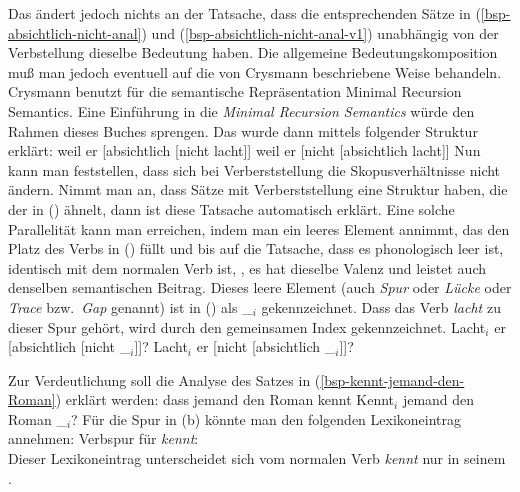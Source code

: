 \begin{enumerate}
{\z
Das ändert jedoch nichts an der Tatsache, dass die entsprechenden
Sätze in (\ref{bsp-absichtlich-nicht-anal}) und (\ref{bsp-absichtlich-nicht-anal-v1}) unabhängig von der Verbstellung
dieselbe Bedeutung haben. Die allgemeine Bedeutungskomposition muß man jedoch eventuell
auf die von Crysmann beschriebene Weise behandeln. Crysmann benutzt für die semantische Repräsentation
Minimal Recursion Semantics. 
Eine Einführung in die \emph{Minimal Recursion Semantics} würde den Rahmen dieses Buches sprengen.%
}
Das wurde dann mittels folgender Struktur erklärt:
\eal
\label{bsp-absichtlich-nicht-anal}
\ex weil er [absichtlich [nicht lacht]]
\ex weil er [nicht [absichtlich lacht]]
\zl
Nun kann man feststellen, dass sich bei Verberststellung die Skopusverhältnisse nicht ändern.
Nimmt man an, dass Sätze mit Verberststellung eine Struktur haben, die der in ()
ähnelt, dann ist diese Tatsache automatisch erklärt. Eine solche Parallelität kann man
erreichen, indem man ein leeres Element annimmt, das den Platz des Verbs in () füllt
und bis auf die Tatsache, dass es phonologisch leer ist, identisch
mit dem normalen Verb ist, \dash, es hat dieselbe Valenz und leistet auch denselben semantischen
Beitrag. Dieses leere Element (auch \emph{Spur} oder \emph{Lücke}
oder \emph{Trace} bzw.\ \emph{Gap} genannt)
ist in () als \_$_i$ gekennzeichnet. 
Dass das Verb \emph{lacht} zu dieser Spur gehört, wird durch den gemeinsamen
Index gekennzeichnet.
\eal
\label{bsp-absichtlich-nicht-anal-v1}
\ex Lacht$_i$ er [absichtlich [nicht \_$_i$]]?
\ex Lacht$_i$ er [nicht [absichtlich \_$_i$]]?
\zl{}
\nocite{Hoehle88a,Hoehle97a}
\end{enumerate}
Zur Verdeutlichung soll die Analyse des Satzes in (\ref{bsp-kennt-jemand-den-Roman}) erklärt werden:
\eal
\ex dass jemand den Roman kennt\label{bsp-dass-jemand-den-Roman-kennt}
\ex Kennt$_i$ jemand den Roman \_$_i$?\label{bsp-kennt-jemand-den-Roman}
\zl
Für die Spur in (b) könnte man den folgenden Lexikoneintrag annehmen:
\ea
Verbspur für \emph{kennt}:\\\samepage
{}
\z
Dieser Lexikoneintrag unterscheidet sich vom normalen Verb \emph{kennt} nur in seinem \phonw.

